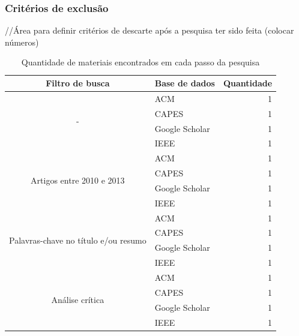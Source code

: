 \documentclass[a4paper,11pt]{article}
\begin{document}
		\subsubsection{Critérios de exclusão}
			//Área para definir critérios de descarte após a pesquisa ter sido feita (colocar números)
			\begin{table}[H]
				\centering
				\begin{tabular}{| c | l | r |} \hline \textbf{Filtro de busca} & \textbf{Base de dados}  & \textbf{Quantidade} \\ \hline
					\multirow{4}{*}{-}
						& ACM & 1 \\ \cline{2-3}
						& CAPES & 1 \\ \cline{2-3}
						& Google Scholar & 1 \\ \cline{2-3}
						& IEEE & 1 \\ \cline{2-3}
					\hline \hline
					\multirow{4}{*}{Artigos entre 2010 e 2013} 
						& ACM & 1 \\ \cline{2-3}
						& CAPES & 1 \\ \cline{2-3}
						& Google Scholar & 1 \\ \cline{2-3}
						& IEEE & 1 \\ \cline{2-3}
					\hline \hline
					\multirow{4}{*}{Palavras-chave no título e/ou resumo} 
						& ACM & 1 \\ \cline{2-3}
						& CAPES & 1 \\ \cline{2-3}
						& Google Scholar & 1 \\ \cline{2-3}
						& IEEE & 1 \\ \cline{2-3}
					\hline \hline
					\multirow{4}{*}{Análise crítica}
						& ACM & 1 \\ \cline{2-3}
						& CAPES & 1 \\ \cline{2-3}
						& Google Scholar & 1 \\ \cline{2-3}
						& IEEE & 1 \\ \cline{2-3}
					\hline
				\end{tabular}
				\caption{Quantidade de materiais encontrados em cada passo da pesquisa}
				\label{tab:quantidadeDeMateriais}
			\end{table}

\newpage


\end{document}

